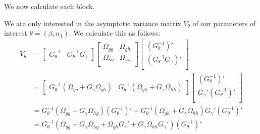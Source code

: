 \documentclass[12pt]{article}
\begin{document}
We now calculate each block.

We are only interested in the asymptotic variance matrix $V_\theta$ of our parameters of interest $\theta = (\beta, \alpha_1)$.
We calculate this as follows:
\begin{align*}
  V_\theta &= \left[
  \begin{array}{cc}
    G_\theta^{-1} & G_{\theta}^{-1}G_\gamma
  \end{array}
\right]
\left[
\begin{array}{cc}
  \Omega_{gg} & \Omega_{gh}\\
  \Omega_{hg} & \Omega_{hh}\\
\end{array}
\right]
\left[
\begin{array}{c}
  \left( G_\theta^{-1} \right)'\\
  \left( G_\theta^{-1}G_{\gamma} \right)'\\
\end{array}
\right] \\
&= 
  \left[\begin{array}{cc}
      G_\theta^{-1}\left(\Omega_{gg} + G_\gamma \Omega_{gh}  \right) & 
      G_{\theta}^{-1}\left( \Omega_{gh} + G_\gamma \Omega_{hh} \right)
  \end{array}
\right]
\left[
\begin{array}{c}
  \left( G_\theta^{-1} \right)'\\
  G_{\gamma}' \left( G_\theta^{-1}\right)'\\
\end{array}
\right]\\
&= G_\theta^{-1}\left(\Omega_{gg} + G_\gamma \Omega_{hg}  \right)\left( G_{\theta}^{-1} \right)' + G_\theta^{-1}\left( \Omega_{gh} + G_\gamma \Omega_{hh}\right)G_\gamma' \left( G_\theta^{-1} \right)'\\
&= G_\theta^{-1}\left(\Omega_{gg} + G_\gamma \Omega_{hg} + \Omega_{gh}G_\gamma' + G_\gamma \Omega_{hh} G_\gamma'\right)\left( G_\theta^{-1} \right)'
\end{align*}
\end{document}

